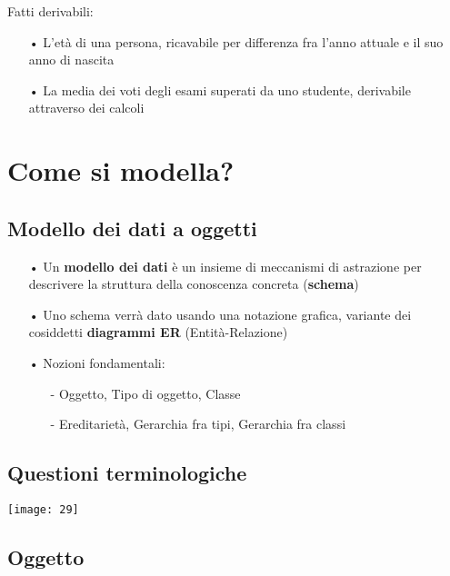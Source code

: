 \documentclass[12pt, letterpaper]{article}
\begin{document}
Fatti derivabili:

\begin{itemize}
   \item[•] L'età di una persona, ricavabile per differenza fra l'anno attuale e il suo anno di nascita 
   \item[•] La media dei voti degli esami superati da uno studente, derivabile attraverso dei calcoli 
\end{itemize}

\section{Come si modella?}

\subsection{Modello dei dati a oggetti}

\begin{itemize}
   \item[•] Un \textbf{modello dei dati} è un insieme di meccanismi di astrazione per descrivere la struttura della conoscenza concreta (\textbf{schema})
   \item[•] Uno schema verrà dato usando una notazione grafica, variante dei cosiddetti
      \textbf{diagrammi ER} (Entità-Relazione)
   \item[•] Nozioni fondamentali:
      \begin{itemize}
         \item[-] Oggetto, Tipo di oggetto, Classe 
         \item[-] Ereditarietà, Gerarchia fra tipi, Gerarchia fra classi 
      \end{itemize}
\end{itemize}

\subsection{Questioni terminologiche}

\texttt{[image: 29]}

\newpage

\subsection{Oggetto}
\end{document}
